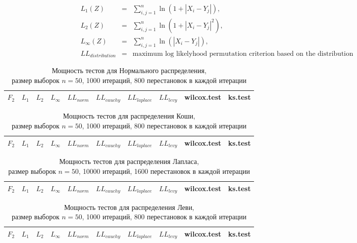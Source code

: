 \documentclass{article}
\begin{document}
\begin{eqnarray}
  \label{L1}
  L_1(Z)&=&\sum_{i,j=1}^{n}{\ln(1+|X_{i}-Y_{j}|)},\\
  \label{L2}
  L_2(Z)&=&\sum_{i,j=1}^{n}{\ln(1+|X_{i}-Y_{j}|^2)},\\
  \label{Linf}
  L_\infty(Z)&=&\sum_{i,j=1}^{n}{\ln(|X_{i}-Y_{j}|)},\\
  \label{LL}
  LL_{distribution} &=& \text{maximum log likelyhood permutation criterion based on the distribution}
\end{eqnarray}

\begin{longtable}{|c|c|c|c|c|c|c|c|c|c|}
  \caption{Мощность тестов для Нормального распределения,\\размер выборок $n=50$, 1000 итераций, 800 перестановок в каждой итерации}
  \label{table:n50} \\
  \hline
  $F_2$ & $L_{1}$ & $L_{2}$ & $L_{\infty}$ & $LL_{norm}$ & $LL_{cauchy}$ & $LL_{laplace}$ & $LL_{levy}$ & wilcox.test & ks.test \\ \hline
  
\end{longtable}

\begin{longtable}{|c|c|c|c|c|c|c|c|c|c|}
  \caption{Мощность тестов для распределения Коши,\\размер выборок $n=50$, 1000 итераций, 800 перестановок в каждой итерации}
  \label{table:n50} \\
  \hline
  $F_2$ & $L_{1}$ & $L_{2}$ & $L_{\infty}$ & $LL_{norm}$ & $LL_{cauchy}$ & $LL_{laplace}$ & $LL_{levy}$ & wilcox.test & ks.test \\ \hline
  
\end{longtable}

\begin{longtable}{|c|c|c|c|c|c|c|c|c|c|}
  \caption{Мощность тестов для распределения Лапласа,\\размер выборок $n=50$, 10000 итераций, 1600 перестановок в каждой итерации}
  \label{table:n50} \\
  \hline
  $F_2$ & $L_{1}$ & $L_{2}$ & $L_{\infty}$ & $LL_{norm}$ & $LL_{cauchy}$ & $LL_{laplace}$ & $LL_{levy}$ & wilcox.test & ks.test \\ \hline
  
\end{longtable}

\begin{longtable}{|c|c|c|c|c|c|c|c|c|c|}
  \caption{Мощность тестов для распределения Леви,\\размер выборок $n=50$, 1000 итераций, 800 перестановок в каждой итерации}
  \label{table:n50} \\
  \hline
  $F_2$ & $L_{1}$ & $L_{2}$ & $L_{\infty}$ & $LL_{norm}$ & $LL_{cauchy}$ & $LL_{laplace}$ & $LL_{levy}$ & wilcox.test & ks.test \\ \hline
  
\end{longtable}
\end{document}
